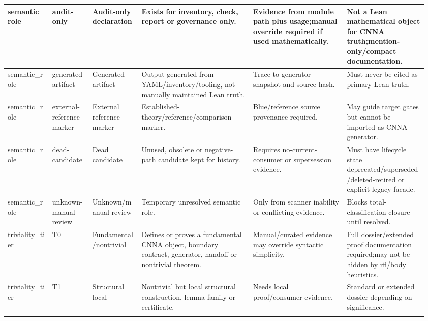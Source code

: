 \begin{longtable}{L{0.105\linewidth} L{0.095\linewidth} L{0.11\linewidth} L{0.255\linewidth} L{0.215\linewidth} L{0.185\linewidth}}
\hline
\addlinespace[0.24em]
semantic\_role & audit-only & Audit-only declaration & Exists for inventory, check, report or governance only. & Evidence from module path plus usage;\newline manual override required if used mathematically. & Not a Lean mathematical object for CNNA truth;\newline mention-only/\allowbreak{}compact documentation.\\
\hline
\addlinespace[0.24em]
semantic\_role & generated-artifact & Generated artifact & Output generated from YAML/\allowbreak{}inventory/\allowbreak{}tooling, not manually maintained Lean truth. & Trace to generator snapshot and source hash. & Must never be cited as primary Lean truth.\\
\hline
\addlinespace[0.24em]
semantic\_role & external-reference-marker & External reference marker & Established-theory/\allowbreak{}reference/\allowbreak{}comparison marker. & Blue/\allowbreak{}reference source provenance required. & May guide target gates but cannot be imported as CNNA generator.\\
\hline
\addlinespace[0.24em]
semantic\_role & dead-candidate & Dead candidate & Unused, obsolete or negative-path candidate kept for history. & Requires no-current-consumer or supersession evidence. & Must have lifecycle state deprecated/\allowbreak{}superseded/\allowbreak{}deleted-retired or explicit legacy facade.\\
\hline
\addlinespace[0.24em]
semantic\_role & unknown-manual-review & Unknown/\allowbreak{}manual review & Temporary unresolved semantic role. & Only from scanner inability or conflicting evidence. & Blocks total-classification closure until resolved.\\
\hline
\addlinespace[0.24em]
triviality\_tier & T0 & Fundamental/\allowbreak{}nontrivial & Defines or proves a fundamental CNNA object, boundary contract, generator, handoff or nontrivial theorem. & Manual/\allowbreak{}curated evidence may override syntactic simplicity. & Full dossier/\allowbreak{}extended proof documentation required;\newline may not be hidden by rfl/\allowbreak{}body heuristics.\\
\hline
\addlinespace[0.24em]
triviality\_tier & T1 & Structural local & Nontrivial but local structural construction, lemma family or certificate. & Needs local proof/\allowbreak{}consumer evidence. & Standard or extended dossier depending on significance.\\
\hline
\addlinespace[0.24em]

\end{longtable}
